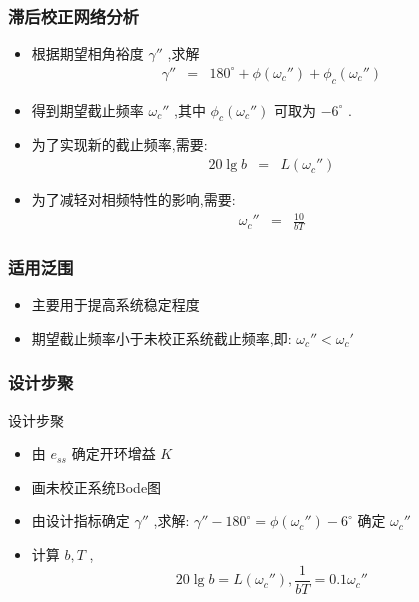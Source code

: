 \documentclass[table]{beamer}
\begin{document}
\begin{frame}
\begin{columns}
\begin{column}{0.5\textwidth}
\begin{block}
\end{block}
\end{column}
\end{columns}
\end{frame}
\begin{frame}
\frametitle{滞后校正网络分析}
\label{sec-1-2}

\begin{itemize}
\item 根据期望相角裕度 $\gamma''$ ,求解
     \begin{eqnarray*}
     \gamma'' & = &180^{\circ}+\phi(\omega_c'')+\phi_c(\omega_c'') 
     \end{eqnarray*}
\item <2->得到期望截止频率 $\omega_c''$ ,其中 $\phi_c(\omega_c'')$ 可取为 $-6^\circ$ .
\item <3->为了实现新的截止频率,需要:
     \begin{eqnarray*}
     20\lg b & = & L(\omega_c'') 
     \end{eqnarray*}
\item <4->为了减轻对相频特性的影响,需要:
     \begin{eqnarray*}
      \omega_c'' & = & \frac{10}{bT}
     \end{eqnarray*}
\end{itemize}
\end{frame}
\begin{frame}
\frametitle{适用泛围}
\label{sec-1-3}

\begin{itemize}
\item 主要用于提高系统稳定程度
\item 期望截止频率小于未校正系统截止频率,即: $\omega_c''<\omega_c'$
\end{itemize}
\end{frame}
\begin{frame}
\frametitle{设计步聚}
\label{sec-1-4}

设计步聚
\begin{itemize}
\item 由 $e_{ss}$ 确定开环增益 $K$
\item 画未校正系统Bode图
\item <2->由设计指标确定 $\gamma''$ ,求解:  $\gamma''-180^{\circ} = \phi(\omega_c'')-6^{\circ}$ 确定 $\omega_c''$
\item <3->计算 $b,T$ , 
         \[20\lg b=L(\omega_c''),\frac{1}{bT}=0.1\omega_c''\]
\end{itemize}
\end{frame}
\end{document}

